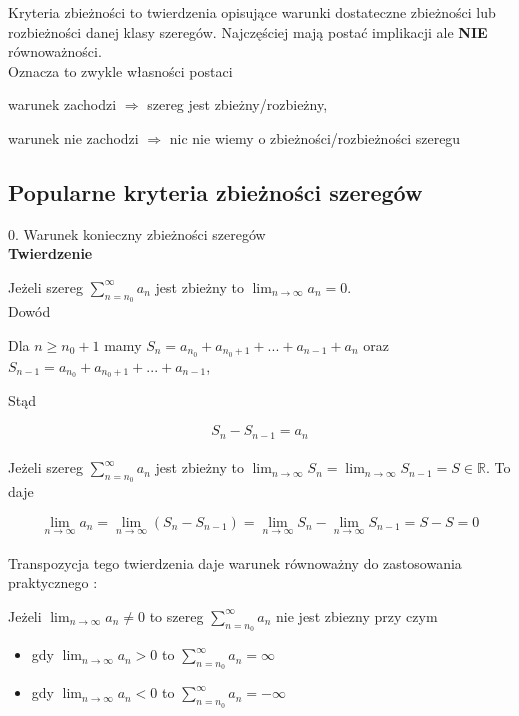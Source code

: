\documentclass[12pt]{article}
\begin{document}
Kryteria zbieżności to twierdzenia opisujące warunki dostateczne zbieżności lub rozbieżności danej klasy szeregów. Najczęściej mają postać
implikacji ale \textbf{NIE} równoważności. \\

Oznacza to zwykle własności postaci

\quad warunek zachodzi $ \Rightarrow $ szereg jest zbieżny/rozbieżny,

\quad warunek nie zachodzi $\Rightarrow$ nic nie wiemy o zbieżności/rozbieżności szeregu \\

\subsection*{Popularne kryteria zbieżności szeregów}

0. Warunek konieczny zbieżności szeregów \\ 

\textbf{Twierdzenie}

Jeżeli szereg $ \sum\limits_{n = n_0}^{\infty} a_n $ jest zbieżny to $ \lim_{n \to \infty} a_n = 0 $. \\

Dowód 

Dla $ n \geq n_0 + 1 $ mamy $ S_n = a_{n_0} + a_{n_0 + 1} + ... + a_{n - 1} + a_n $ oraz 
$ S_{n - 1} = a_{n_0} + a_{n_0 + 1} + ... + a_{n - 1} $,

Stąd

$$ S_n - S_{n - 1} = a_n $$ \\

Jeżeli szereg $ \sum\limits_{n = n_0}^{\infty} a_n $ jest zbieżny to $ \lim_{n \to \infty} S_n = \lim_{n \to \infty} S_{n - 1} = S \in \mathbb{R} $.
To daje

$$ \lim_{n \to \infty} a_n = \lim_{n \to \infty} (S_n - S_{n - 1}) = \lim_{n \to \infty} S_n - \lim_{n \to \infty} S_{n - 1} = S - S = 0 $$ \\

Transpozycja tego twierdzenia daje warunek równoważny do zastosowania praktycznego :

Jeżeli $ \lim_{n \to \infty} a_n \neq 0 $ to szereg $ \sum\limits_{n = n_0}^{\infty} a_n $ nie jest zbiezny przy czym

\begin{itemize}
    \item gdy $ \lim_{n \to \infty} a_n > 0 $ to $ \sum\limits_{n = n_0}^{\infty} a_n = \infty $
    \item gdy $ \lim_{n \to \infty} a_n < 0 $ to $ \sum\limits_{n = n_0}^{\infty} a_n = -\infty $ 
\end{itemize}
\end{document}
